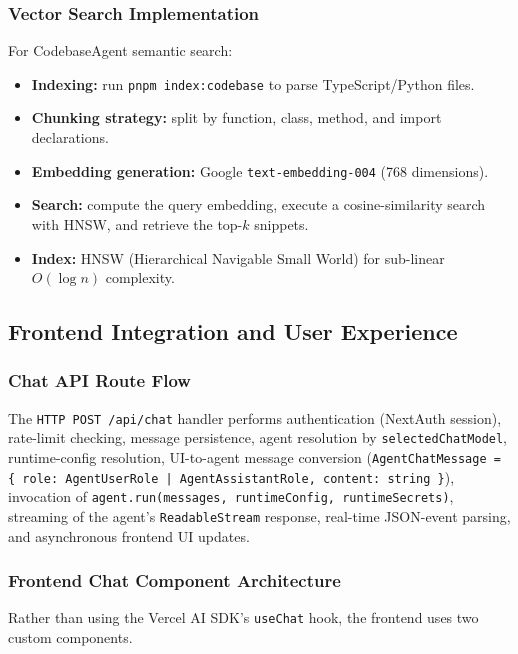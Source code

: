 \documentclass[11pt,a4paper]{report}
\newcommand{\code}[1]{\texttt{\small #1}}
\begin{document}
\subsubsection{Vector Search Implementation}

For CodebaseAgent semantic search:

\begin{itemize}
  \item \textbf{Indexing:} run \code{pnpm index:codebase} to parse TypeScript/Python files.
  \item \textbf{Chunking strategy:} split by function, class, method, and import declarations.
  \item \textbf{Embedding generation:} Google \code{text-embedding-004} (768 dimensions).
  \item \textbf{Search:} compute the query embedding, execute a cosine-similarity search with HNSW, and retrieve the top-$k$ snippets.
  \item \textbf{Index:} HNSW (Hierarchical Navigable Small World) for sub-linear $O(\log n)$ complexity.
\end{itemize}

\subsection{Frontend Integration and User Experience}

\subsubsection{Chat API Route Flow}

The \code{HTTP POST /api/chat} handler performs authentication (NextAuth
session), rate-limit checking, message persistence, agent resolution by
\code{selectedChatModel}, runtime-config resolution, UI-to-agent message
conversion (\code{AgentChatMessage = \{ role: AgentUserRole |
AgentAssistantRole, content: string \}}), invocation of
\code{agent.run(messages, runtimeConfig, runtimeSecrets)}, streaming of the
agent's \code{ReadableStream} response, real-time JSON-event parsing, and
asynchronous frontend UI updates.

\subsubsection{Frontend Chat Component Architecture}

Rather than using the Vercel AI SDK's \code{useChat} hook, the frontend uses
two custom components.
\end{document}
